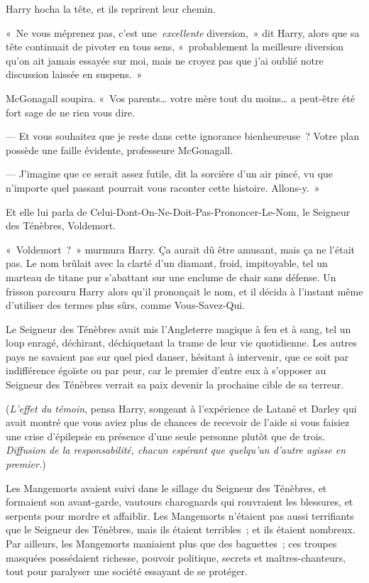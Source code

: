 Harry hocha la tête, et ils reprirent leur chemin.

«~Ne vous méprenez pas, c'est une~\emph{excellente} diversion,~» dit Harry, alors que sa tête continuait de pivoter en tous sens, «~probablement la meilleure diversion qu'on ait jamais essayée sur moi, mais ne croyez pas que j'ai oublié notre discussion laissée en suspens.~»

McGonagall soupira. «~Vos parents… votre mère tout du moins… a peut-être été fort sage de ne rien vous dire.

--- Et vous souhaitez que je reste dans cette ignorance bienheureuse~?  Votre plan possède une faille évidente, professeure McGonagall.

--- J'imagine que ce serait assez futile, dit la sorcière d'un air pincé, vu que n'importe quel passant pourrait vous raconter cette histoire. Allons-y.~»

Et elle lui parla de Celui-Dont-On-Ne-Doit-Pas-Prononcer-Le-Nom, le Seigneur des Ténèbres, Voldemort.

«~Voldemort~?~» murmura Harry. Ça aurait dû être amusant, mais ça ne l'était pas. Le nom brûlait avec la clarté d'un diamant, froid, impitoyable, tel un marteau de titane pur s'abattant sur une enclume de chair sans défense. Un frisson parcouru Harry alors qu'il prononçait le nom, et il décida à l'instant même d'utiliser des termes plus sûrs, comme Vous-Savez-Qui.

Le Seigneur des Ténèbres avait mis l'Angleterre magique à feu et à sang, tel un loup enragé, déchirant, déchiquetant la trame de leur vie quotidienne. Les autres pays ne savaient pas sur quel pied danser, hésitant à intervenir, que ce soit par indifférence égoïste ou par peur, car le premier d'entre eux à s'opposer au Seigneur des Ténèbres verrait sa paix devenir la prochaine cible de sa terreur.

(\emph{L'effet du témoin}, pensa Harry, songeant à l'expérience de Latané et Darley qui avait montré que vous aviez plus de chances de recevoir de l'aide si vous faisiez une crise d'épilepsie en présence d'une seule personne plutôt que de trois.  \emph{Diffusion de la responsabilité, chacun espérant que quelqu'un d'autre agisse en premier.})

Les Mangemorts avaient suivi dans le sillage du Seigneur des Ténèbres, et formaient son avant-garde, vautours charognards qui rouvraient les blessures, et serpents pour mordre et affaiblir. Les Mangemorts n'étaient pas aussi terrifiants que le Seigneur des Ténèbres, mais ils étaient terribles~; et ils étaient nombreux. Par ailleurs, les Mangemorts maniaient plus que des baguettes~; ces troupes masquées possédaient richesse, pouvoir politique, secrets et maîtres-chanteurs, tout pour paralyser une société essayant de se protéger.


